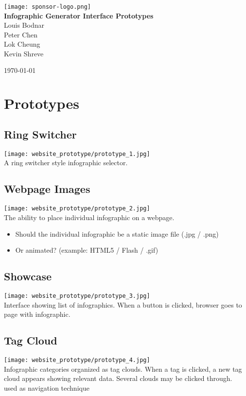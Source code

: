\documentclass[11pt,a4paper,oneside]{article}
\begin{document}
\begin{titlepage}

\begin{center}

\texttt{[image: sponsor-logo.png]}\\[1cm]    

{ \huge \bfseries Infographic Generator Interface Prototypes}\\[0.4cm]

Louis Bodnar\\
Peter Chen\\
Lok Cheung\\
Kevin Shreve\\



\vfill

{\large \today}

\end{center}

\end{titlepage}
\section {Prototypes}
\subsection{Ring Switcher}
\texttt{[image: website\_prototype/prototype\_1.jpg]}\\
A ring switcher style infographic selector.  

\subsection{Webpage Images}
\texttt{[image: website\_prototype/prototype\_2.jpg]}\\
The ability to place individual infographic on a webpage.\\
\begin{itemize}
\item Should the individual infographic be a static image file (.jpg / .png)\\
\item Or animated? (example: HTML5 / Flash / .gif)\\
\end{itemize}

\subsection{Showcase}
\texttt{[image: website\_prototype/prototype\_3.jpg]}\\
Interface showing list of infographics.  When a button is clicked, browser goes to page with infographic.\\

\subsection{Tag Cloud}
\texttt{[image: website\_prototype/prototype\_4.jpg]}\\
Infographic categories organized as tag clouds.  When a tag is clicked, a new tag cloud appears showing relevant data.  Several clouds may be clicked through.\\
used as navigation technique
\end{document}
